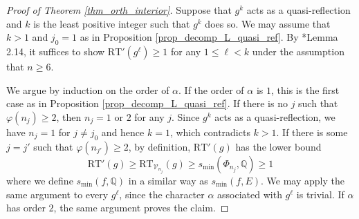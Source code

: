 \documentclass[11pt]{amsart}
\theoremstyle{plain}
\theoremstyle{definition}
\numberwithin{equation}{section}
\newcommand{\bbQ}{\mathbb{Q}}
\newcommand{\calV}{\mathcal{V}}
\begin{document}
\begin{proof}[Proof of Theorem \ref{thm_orth_interior}]
    Suppose that $g^k$ acts as a quasi-reflection and $k$ is the least positive integer such that $g^k$ does so.
    We may assume that $k >1$ and $j_0 = 1$ as in Proposition \ref{prop_decomp_L_quasi_ref}.
    By \cite{Gritsenko2007kodaira}*{Lemma 2.14}, it suffices to show $\mathrm{RT}'(g^\ell) \geq 1$ for any $1 \leq \ell <k$ under the assumption that $n \geq 6$. 
    
        We argue by induction on the order of $\alpha$.
    If the order of $\alpha$ is $1$, this is the first case as in Proposition \ref{prop_decomp_L_quasi_ref}.
    If there is no $j$ such that $\varphi(n_j) \geq 2$, then $n_j = 1$ or $2$ for any $j$.
    Since $g^k$ acts as a quasi-reflection, we have $n_j = 1$ for $j \neq j_0$ and hence $k=1$, which contradicts $k>1$.
    If there is some $j=j'$ such that $\varphi(n_{j'}) \geq 2$, by definition, $\mathrm{RT}'(g)$ has the lower bound
    \[
    \mathrm{RT}'(g) \geq \mathrm{RT}_{\calV_{n_j}}(g) \geq s_{\min}(\Phi_{n_j}, \bbQ) \geq 1
    \]
    where we define $s_{\min}(f,\bbQ)$ in a similar way as $s_{\min}(f,E)$.
        We may apply the same argument to every $g^\ell$, since the character $\alpha$ associated with $g^\ell$ is trivial.
    If $\alpha$ has order $2$, the same argument proves the claim.


\end{proof}
\end{document}
